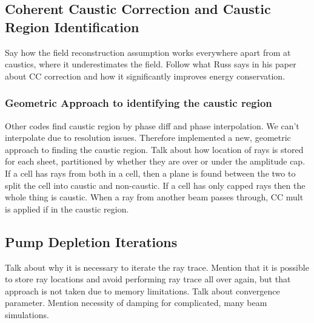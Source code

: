 \subsection{Coherent Caustic Correction and Caustic Region Identification}

Say how the field reconstruction assumption works everywhere apart from at caustics, where it underestimates the field.
Follow what Russ says in his paper about CC correction and how it significantly improves energy conservation.

\subsubsection{Geometric Approach to identifying the caustic region}

Other codes find caustic region by phase diff and phase interpolation.
We can't interpolate due to resolution issues.
Therefore implemented a new, geometric approach to finding the caustic region.
Talk about how location of rays is stored for each sheet, partitioned by whether they are over or under the amplitude cap.
If a cell has rays from both in a cell, then a plane is found between the two to split the cell into caustic and non-caustic.
If a cell has only capped rays then the whole thing is caustic.
When a ray from another beam passes through, CC mult is applied if in the caustic region.

\subsection{Pump Depletion Iterations}%
\label{sec:pump_dep_iters}

Talk about why it is necessary to iterate the ray trace.
Mention that it is possible to store ray locations and avoid performing ray trace all over again, but that approach is not taken due to memory limitations.
Talk about convergence parameter.
Mention necessity of damping for complicated, many beam simulations.


